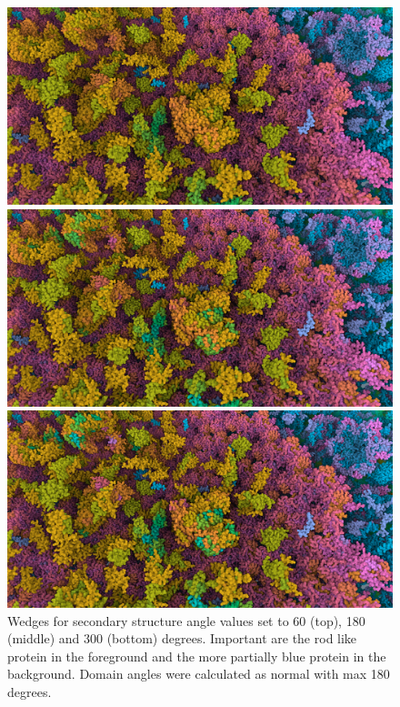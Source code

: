 \documentclass{article}
\begin{document}
	\begin{figure}[t]
		\includegraphics[width=0.95\linewidth,keepaspectratio]{supplementaryMaterial/secondary60} 
		
		\vspace{0.1cm}
		
		\includegraphics[width=0.95\linewidth,keepaspectratio]{supplementaryMaterial/secondary180} 
		
		\vspace{0.1cm}
		
		\includegraphics[width=0.95\linewidth,keepaspectratio]{supplementaryMaterial/secondary300} 
		\caption{Wedges for secondary structure angle values set to 60 (top), 180 (middle) and 300 (bottom) degrees. Important are the rod like protein in the foreground and the more partially blue protein in the background. Domain angles were calculated as normal with max 180 degrees.}
	\end{figure}
	
\end{document}
